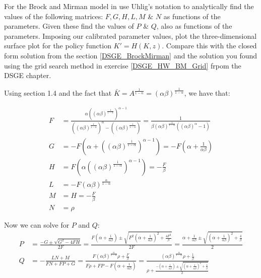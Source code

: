 \documentclass[letterpaper,11pt]{article}
\theoremstyle{definition}
\begin{document}
\begin{spacing}{1.5}
	\setcounter{Exercise}{0}
	\begin{Exercise} \label{Linear_HW_BM_Coeffs}
		For the Brock and Mirman model in use Uhlig's notation to analytically find the values of the following matrices: $F, G, H, L, M$ \& $N$ as functions of the parameters.  Given these find the values of $P$ \& $Q$, also as functions of the parameters.  Imposing our calibrated parameter values, plot the three-dimensional surface plot for the policy function $K' = H(K,z)$.  Compare this with the closed form solution from the section \eqref{DSGE_BrockMirman} and the solution you found using the grid search method in exercise \ref{DSGE_HW_BM_Grid} frpom the DSGE chapter.
	\end{Exercise}

	Using section 1.4 and the fact that $\bar{K} = A^{\frac{1}{1-\alpha}} = (\alpha\beta)^{\frac{1}{1-\alpha}}$, we have that:

	\begin{align*}
		F &= \frac{\alpha ((\alpha\beta)^{\frac{1}{1-\alpha}})^{\alpha-1}}{((\alpha\beta)^{\frac{1}{1-\alpha}})^\alpha-((\alpha\beta)^{\frac{1}{1-\alpha}})} = \frac{1}{\beta(\alpha\beta)^{\frac{1}{1-\alpha}}((\alpha\beta)^\alpha -1)} \\
		G &= - F(\alpha +((\alpha\beta)^{\frac{1}{1-\alpha}})^{\alpha-1}) = -F(\alpha + \frac{1}{\alpha\beta}) \\
		H &= F(\alpha((\alpha\beta)^{\frac{1}{1-\alpha}})^{\alpha-1}) = -\frac{F}{\beta} \\
		L &= -F(\alpha\beta)^{\frac{\alpha}{1-\alpha}}\\
		M &= H = -\frac{F}{\beta} \\
		N &= \rho
	\end{align*}

	Now we can solve for $P$ and $Q$:
	\begin{align*}
		P &= \frac{-G \pm \sqrt{G^2-4FH}}{2F} = \frac{F(\alpha + \frac{1}{\alpha\beta}) \pm \sqrt{F^2(\alpha + \frac{1}{\alpha\beta})^2 + \frac{4F^2}{\beta}}}{2F} = \frac{\alpha + \frac{1}{\alpha\beta} \pm \sqrt{(\alpha+\frac{1}{\alpha\beta})^2+\frac{4}{\beta}}}{2} \\
		Q &= -\frac{LN+M}{FN+FP+G} = \frac{F(\alpha\beta)^{\frac{\alpha}{1-\alpha}}\rho + \frac{F}{\beta}}{F\rho+FP-F(\alpha+\frac{1}{\alpha\beta})} = \frac{(\alpha\beta)^{\frac{\alpha}{1-\alpha}}\rho + \frac{1}{\beta}}{\rho+\frac{-(\alpha + \frac{1}{\alpha\beta}) \pm \sqrt{(\alpha+\frac{1}{\alpha\beta})^2+\frac{4}{\beta}}}{2} }
	\end{align*}


\end{spacing}
\end{document}
